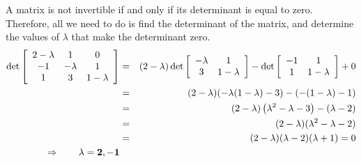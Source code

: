 \vspace{2mm}
A matrix is not invertible if and only if its determinant is equal to zero. Therefore, all we need to do is find the determinant of the matrix, and determine the values of $\lambda$ that make the determinant zero.
\begin{eqnarray*}
\det\left[\begin{array}{ccc}2-\lambda&1&0\\-1&-\lambda&1\\1&3&1-\lambda\end{array}\right] &=&
(2-\lambda)\det\left[\begin{array}{cc}-\lambda&1\\3&1-\lambda\end{array}\right] -
\det\left[\begin{array}{cc}-1&1\\1&1-\lambda\end{array}\right] + 0\\
&=&(2-\lambda)(-\lambda(1-\lambda)-3)-(-(1-\lambda)-1)\\
&=&(2-\lambda)\left(\lambda^2-\lambda-3\right)-(\lambda-2)\\
&=&(2-\lambda)(\lambda^2-\lambda-2)\\
&=&(2-\lambda)(\lambda-2)(\lambda+1)=0\\
\Rightarrow\qquad \lambda=\bf{2,-1}
\end{eqnarray*}

